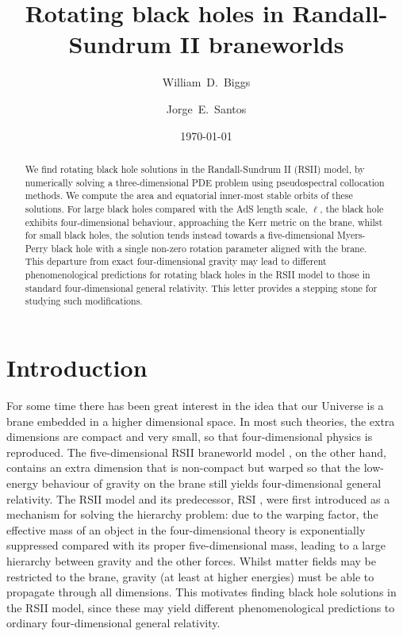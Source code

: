 \documentclass[%
 reprint,
 amsmath,amssymb,
 aps,
]{revtex4-2}
\begin{document}

\title{Rotating black holes in Randall-Sundrum II braneworlds}

\author{William~D.~Biggs}
\author{Jorge~E.~Santos}%
%

\date{\today}

\begin{abstract}
We find rotating black hole solutions in the Randall-Sundrum II (RSII) model, by numerically solving a three-dimensional PDE problem using pseudospectral collocation methods. We compute the area and equatorial inner-most stable orbits of these solutions. For large black holes compared with the AdS length scale, $\ell$, the black hole exhibits four-dimensional behaviour, approaching the Kerr metric on the brane, whilst for small black holes, the solution tends instead towards a five-dimensional Myers-Perry black hole with a single non-zero rotation parameter aligned with the brane. This departure from exact four-dimensional gravity may lead to different phenomenological predictions for rotating black holes in the RSII model to those in standard four-dimensional general relativity. This letter provides a stepping stone for studying such modifications.
\end{abstract}

\maketitle
\section{Introduction}
For some time there has been great interest in the idea that our Universe is a brane embedded in a higher dimensional space. In most such theories, the extra dimensions are compact and very small, so that four-dimensional physics is reproduced. The five-dimensional RSII braneworld model \cite{Randall:1999vf}, on the other hand, contains an extra dimension that is non-compact but warped so that the low-energy behaviour of gravity on the brane still yields four-dimensional general relativity. The RSII model and its predecessor, RSI \cite{Randall:1999ee}, were first introduced as a mechanism for solving the hierarchy problem: due to the warping factor, the effective mass of an object in the four-dimensional theory is exponentially suppressed compared with its proper five-dimensional mass, leading to a large hierarchy between gravity and the other forces. Whilst matter fields may be restricted to the brane, gravity (at least at higher energies) must be able to propagate through all dimensions. This motivates finding black hole solutions in the RSII model, since these may yield different phenomenological predictions to ordinary four-dimensional general relativity.
\end{document}
